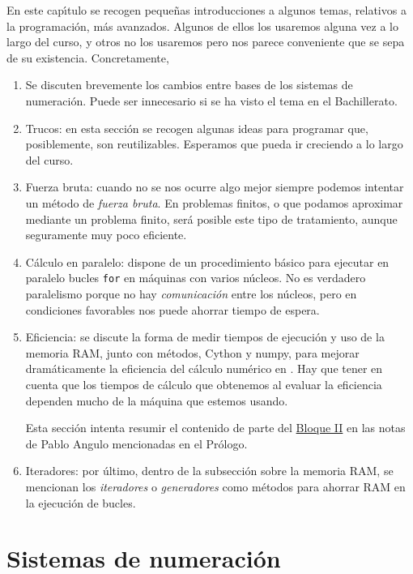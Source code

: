 
En este cap\'{\i}tulo se recogen peque\~nas introducciones a algunos temas,
relativos a la programaci\'on, m\'as avanzados. Algunos de ellos los usaremos
alguna vez a lo largo del curso, y otros no los usaremos pero nos parece
conveniente que se sepa de su existencia. Concretamente,
\begin{enumerate}
 \item Se discuten brevemente los cambios entre bases de los {\sc sistemas de
numeraci\'on}.  Puede ser innecesario si se ha visto el tema en el Bachillerato.
\item {\sc Trucos:} en esta secci\'on se recogen algunas ideas para programar
que, posiblemente, son reutilizables. Esperamos que pueda ir creciendo a lo
largo del curso.
\item {\sc Fuerza bruta:} cuando no se nos ocurre algo mejor siempre podemos
intentar un m\'etodo de {\itshape fuerza bruta}. En problemas finitos, o que
podamos aproximar mediante un problema finito,  ser\'a posible este tipo de
tratamiento,  aunque seguramente muy poco eficiente.
\item {\sc C\'alculo en paralelo:}  {\sage} dispone de un procedimiento b\'asico
para ejecutar en paralelo bucles \lstinline|for| en m\'aquinas con varios
n\'ucleos. No es verdadero paralelismo porque no hay {\itshape comunicaci\'on}
entre
los n\'ucleos, pero en condiciones favorables nos puede ahorrar tiempo de
espera.

\item{\sc Eficiencia:} se discute la forma de medir tiempos de ejecuci\'on y uso
de la memoria RAM, junto con m\'etodos, Cython y numpy, para mejorar
dram\'aticamente la eficiencia del c\'alculo num\'erico en \sage. Hay que tener
en cuenta que los tiempos de c\'alculo que obtenemos al evaluar la eficiencia
dependen mucho de la m\'aquina que estemos usando.

Esta secci\'on intenta resumir el contenido de parte del 
\href{http://verso.mat.uam.es/~pablo.angulo/doc/laboratorio/bloqueII.html}{Bloque II} en las notas de Pablo Angulo mencionadas en el Pr\'ologo.
 
 
 \item{\sc Iteradores:} por \'ultimo, dentro de la subsecci\'on sobre la memoria
RAM,  se mencionan los {\itshape iteradores} o
{\itshape generadores} como m\'etodos para ahorrar RAM en la ejecuci\'on de
bucles.
\end{enumerate}


\section{Sistemas de numeraci\'on}\label{bases-num}



